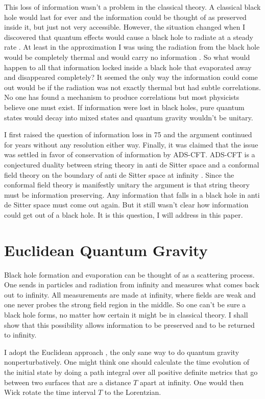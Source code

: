 \documentclass[aps,prd,groupedaddress,showpacs,12pt,nofootinbib]{revtex4-1}
\begin{document}
This loss of information wasn't a problem in the classical theory. A classical black hole would last for ever and the information could be thought of as preserved inside it, but just not very accessible. However, the situation changed when I discovered that quantum effects would cause a black hole to radiate at a steady rate \cite{Stephen1}. At least in the approximation I was using the radiation from the black hole would be completely thermal and would carry no information \cite{Stephen2}. So what would happen to all that information locked inside a black hole that evaporated away and disappeared completely?  It seemed the only way the information could come out would be if the radiation was not exactly thermal but had subtle correlations. No one has found a mechanism to produce correlations but most physicists believe one must exist. If information were lost in black holes, pure quantum states would decay into mixed states and quantum gravity wouldn't be unitary.

I first raised the question of information loss in 75 and the argument continued for years without any resolution either way. Finally, it was claimed that the issue was settled in favor of conservation of information by ADS-CFT. 
ADS-CFT is a conjectured duality between string theory in anti de Sitter space and a conformal field theory on the boundary of anti de Sitter space at infinity \cite{ADSCFTreviews }. Since the conformal field theory is manifestly unitary the argument is that string theory must be information preserving. Any information that falls in a black hole in anti de Sitter space must come out again. But it still wasn't clear how information could get out of a black hole. It is this question, I will address in this paper. 

\section{Euclidean Quantum Gravity}


Black hole formation and evaporation can be thought of as a scattering process. One sends in particles and radiation from infinity and measures what comes back out to infinity. All measurements are made at infinity, where fields are weak and one never probes the strong field region in the middle. So one can't be sure a black hole forms, no matter how certain it might be in classical theory. I shall show that this possibility allows information to be preserved and to be returned to infinity. 

I adopt the Euclidean approach \cite{EQG}, the only sane way to do quantum gravity nonperturbatively. One might think one should calculate the time evolution of the initial state by doing a path integral over all positive definite metrics that go between two surfaces that are a distance $T$ apart at infinity. One would then Wick rotate the time interval $T$ to the Lorentzian. 
\end{document}
